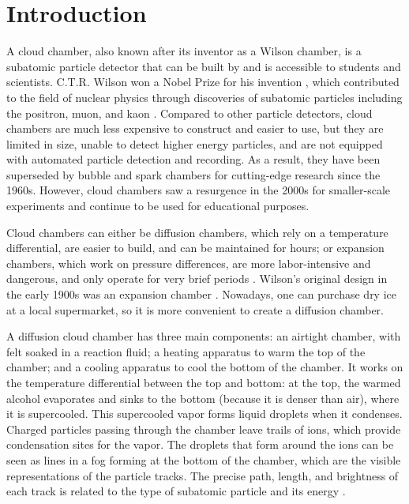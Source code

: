 \documentclass[notitlepage,12pt]{article}
\newcommand{\mycite}[1]{\cite{#1}}
\begin{document}
\clearpage
\section{Introduction}

A cloud chamber, also known after its inventor as a Wilson chamber, is a subatomic particle detector that can be built by and is accessible to students and scientists.  C.T.R. Wilson won a Nobel Prize for his invention \mycite{nobelcloud}, which contributed to the field of nuclear physics through discoveries of subatomic particles including the positron, muon, and kaon \mycite{hyperphysics}.  Compared to other particle detectors, cloud chambers are much less expensive to construct and easier to use, but they are limited in size, unable to detect higher energy particles, and are not equipped with automated particle detection and recording.  As a result, they have been superseded by bubble and spark chambers for cutting-edge research since the 1960s. However, cloud chambers saw a resurgence in the 2000s for smaller-scale experiments and continue to be used for educational purposes. 

Cloud chambers can either be diffusion chambers, which rely on a temperature differential, are easier to build, and can be maintained for hours; or expansion chambers, which work on pressure differences, are more labor-intensive and dangerous, and only operate for very brief periods \mycite{chamberdesign}.  Wilson's original design in the early 1900s was an expansion chamber \mycite{1946}.  Nowadays, one can purchase dry ice at a local supermarket, so it is more convenient to create a diffusion chamber.

A diffusion cloud chamber has three main components: an airtight chamber, with felt soaked in a reaction fluid; a heating apparatus to warm the top of the chamber; and a cooling apparatus to cool the bottom of
the chamber.  It works on the temperature differential between the top and bottom: at the top, the warmed alcohol evaporates and sinks to the bottom (because it is denser than air), where it is supercooled. This supercooled vapor forms liquid
droplets when it condenses. Charged particles passing through the chamber leave trails of ions, which provide condensation sites for the vapor.  The droplets that form around the ions can be seen as lines in a fog forming at the bottom of the chamber, which are the visible representations of the particle tracks.  The precise path, length, and brightness of each track is related to the type of subatomic particle and its energy \mycite{symmetry}.
\end{document}
